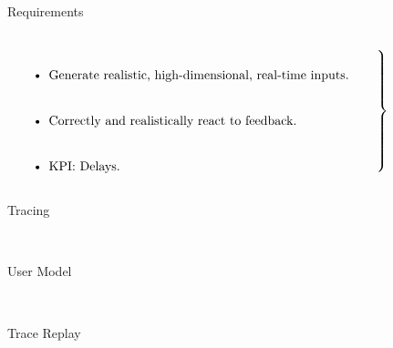 \documentclass[aspectratio=1610]{beamer}
\begin{document}
\begin{frame}{Requirements}
    \begin{columns}[onlytextwidth]
        \begin{column}{.5\linewidth}
            $\left.
            \begin{tabular}{p{.8\linewidth}}
                \begin{itemize}
                    \itemsep2em
                    \item Generate realistic, high-dimensional, real-time inputs.
                    \item Correctly and realistically react to feedback.
                    \item KPI: Delays.
                \end{itemize}
            \end{tabular}%
            \right\}$
        \end{column}%
        \begin{column}{.5\linewidth}
            \centering%
            \Large\bfseries%
        \end{column}
    \end{columns}
\end{frame}

\begin{frame}{Tracing}
    \begin{center}
        \\
    \end{center}
\end{frame}

\begin{frame}{User Model}
    \begin{center}
        \\
        \vspace{.1\textheight}%
    \end{center}
\end{frame}

\begin{frame}{Trace Replay}
    \begin{center}
        \\
    \end{center}
\end{frame}
\end{document}
